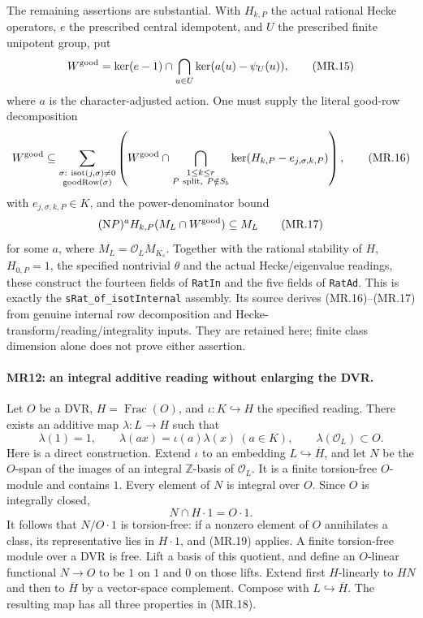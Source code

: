 The remaining assertions are substantial. With $H_{k,P}$ the
actual rational Hecke operators, $e$ the prescribed central
idempotent, and $U$ the prescribed finite unipotent group, put
\[
 W^{\rm good}=\ker(e-1)\cap
      \bigcap_{u\in U}\ker(a(u)-\psi_U(u)),           \tag{MR.15}
\]
where $a$ is the character-adjusted action. One must supply the
literal good-row decomposition
\[
 W^{\rm good}\subseteq
  \sum_{\substack{\sigma:\ \mathrm{isot}(j,\sigma)\ne0\\
                              \mathrm{goodRow}(\sigma)}}
    \left(W^{\rm good}\cap
        \bigcap_{\substack{1\le k\le r\\P\ {\rm split},\ P\notin S_b}}
            \ker(H_{k,P}-e_{j,\sigma,k,P})\right),   \tag{MR.16}
\]
with $e_{j,\sigma,k,P}\in K$, and the power-denominator bound
\[
    (\mathrm N P)^a H_{k,P}(M_L\cap W^{\rm good})
                       \subseteq M_L               \tag{MR.17}
\]
for some $a$, where $M_L=\mathcal O_L M_{K_s}$.
Together with the rational stability of $H$, $H_{0,P}=1$, the
specified nontrivial $\theta$ and the actual Hecke/eigenvalue
readings, these construct the fourteen fields of \texttt{RatIn}
and the five fields of \texttt{RatAd}. This is exactly the
\texttt{sRat\_of\_isotInternal} assembly. Its source derives
(MR.16)--(MR.17) from genuine internal row decomposition and
Hecke-transform/reading/integrality inputs. They are retained here;
finite class dimension alone does not prove either assertion.

\paragraph{MR12: an integral additive reading without enlarging the DVR.}
Let $O$ be a DVR, $H=\operatorname{Frac}(O)$, and
$\iota:K\hookrightarrow H$ the specified reading. There exists an
additive map $\lambda:L\to H$ such that
\[
 \lambda(1)=1,\qquad \lambda(ax)=\iota(a)\lambda(x)
 \ (a\in K),\qquad \lambda(\mathcal O_L)\subset O.    \tag{MR.18}
\]
Here is a direct construction. Extend $\iota$ to an embedding
$L\hookrightarrow\overline H$, and let $N$ be the $O$-span of the
images of an integral $\mathbb Z$-basis of $\mathcal O_L$. It is a
finite torsion-free $O$-module and contains $1$. Every element of $N$
is integral over $O$. Since $O$ is integrally closed,
\[
                      N\cap H\cdot1=O\cdot1.        \tag{MR.19}
\]
It follows that $N/O\cdot1$ is torsion-free: if a nonzero element
of $O$ annihilates a class, its representative lies in $H\cdot1$,
and (MR.19) applies. A finite torsion-free module over a DVR is free.
Lift a basis of this quotient, and define an $O$-linear functional
$N\to O$ to be $1$ on $1$ and $0$ on those lifts. Extend first
$H$-linearly to $HN$ and then to $\overline H$ by a vector-space
complement. Compose with $L\hookrightarrow\overline H$.
The resulting map has all three properties in (MR.18).

